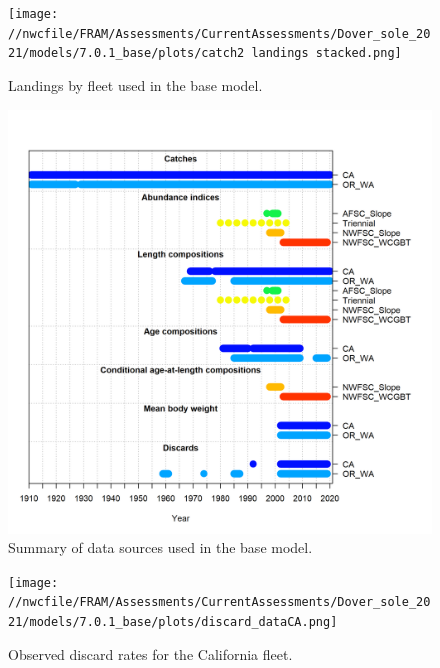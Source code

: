 \documentclass[11pt,
  english,
  a4paper,
]{article}
\begin{document}
\tagmcend\tagstructend


\begin{figure}
\centering
\texttt{[image: //nwcfile/FRAM/Assessments/CurrentAssessments/Dover\_sole\_2021/models/7.0.1\_base/plots/catch2 landings stacked.png]}
\caption{Landings by fleet used in the base model.\label{fig:catch}}
\end{figure}

\tagmcend\tagstructend


\begin{figure}
\centering
\includegraphics[width=1\textwidth,height=1\textheight]{figs/data_plot.png}
\caption{Summary of data sources used in the base model.\label{fig:data-plot}}
\end{figure}

\tagmcend\tagstructend


\begin{figure}
\centering
\texttt{[image: //nwcfile/FRAM/Assessments/CurrentAssessments/Dover\_sole\_2021/models/7.0.1\_base/plots/discard\_dataCA.png]}
\caption{Observed discard rates for the California fleet.\label{fig:ca-disc-ob}}
\end{figure}
\end{document}
